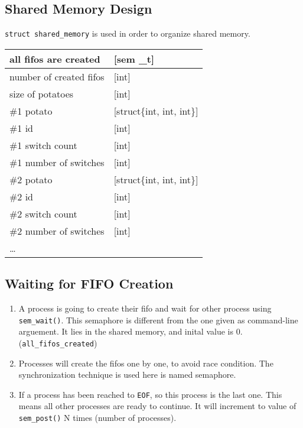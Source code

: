 \documentclass[a4paper]{article}
\begin{document}
\newpage
\subsection{Shared Memory Design}
\label{sec:org3550aa2}
\texttt{struct shared\_memory} is used in order to organize shared memory.

\begin{center}
\ttfamily{}
\begin{tabular}{l|l}
all fifos are created & [sem \_t]\\
\hline
number of created fifos & [int]\\
\hline
size of potatoes & [int]\\
\hline
\#1 potato & [struct\{int, int, int\}]\\
\quad \#1 id & [int]\\
\quad \#1 switch count & [int]\\
\quad \#1 number of switches & [int]\\
\hline
\#2 potato & [struct\{int, int, int\}]\\
\quad \#2 id & [int]\\
\quad \#2 switch count & [int]\\
\quad \#2 number of switches & [int]\\
\hline
\ldots{} & \\
\end{tabular}
\end{center}

\subsection{Waiting for FIFO Creation}
\label{sec:org1c542d8}
\begin{enumerate}
\item A process is going to create their fifo and wait for other process using \texttt{sem\_wait()}. This semaphore is different from the one given as command-line arguement. It lies in the shared memory, and inital value is 0. (\texttt{all\_fifos\_created})
\item Processes will create the fifos one by one, to avoid race condition. The synchronization technique is used here is named semaphore.
\item If a process has been reached to \texttt{EOF}, so this process is the last one. This means all other processes are ready to continue. It will increment to value of \texttt{sem\_post()} N times (number of processes).
\end{enumerate}
\end{document}
